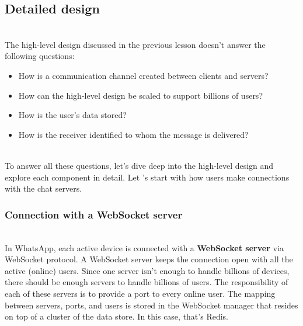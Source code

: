 

\subsection{Detailed design}\label{Rq5YKC46WsJFtaM9iQSac}
\\
The high-level design discussed in the previous lesson doesn't answer the following questions:

\begin{itemize}
\item
\protect{}\label{QMgIhUenhpdQNpCwoww-4}
How is a communication channel created between clients and servers?
\item
\protect{}\label{of2Sde2VeQY7hnWvhOynh}
How can the high-level design be scaled to support billions of users?
\item
\protect{}\label{Avmm2XXX8yAdYij4wPlbX}
How is the user's data stored?
\item
\protect{}\label{4go97-LnkJUmeSXnc4xJ3}
How is the receiver identified to whom the message is delivered?
\end{itemize}
\\
To answer all these questions, let's dive deep into the high-level design and explore each component in detail. Let 's start with how users make connections with the chat servers.

\subsubsection{Connection with a WebSocket server}\label{B5B1o_aVayCnSRGLokV2u}
\\
In WhatsApp, each active device is connected with a \textbf{WebSocket server} via WebSocket protocol. A WebSocket server keeps the connection open with all the active (online) users. Since one server isn't enough to handle billions of devices, there should be enough servers to handle billions of users. The responsibility of each of these servers is to provide a port to every online user. The mapping between servers, ports, and users is stored in the WebSocket manager that resides on top of a cluster of the data store. In this case, that's Redis.

